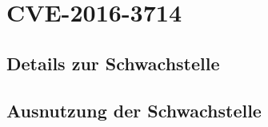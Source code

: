 \chapter{CVE-2016-3714}\label{ch:cve}

\section{Details zur Schwachstelle}\label{sec:details-zur-schwachstelle}


%
%
\section{Ausnutzung der Schwachstelle}\label{sec:ausnutzung-der-schwachstelle}












%